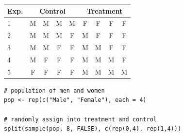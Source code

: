 \documentclass[14pt]{beamer}
\begin{document}
\begin{frame}[fragile]

\begin{center}
\begin{tabular}{lcccccccc}
Exp. & \multicolumn{4}{c}{Control} & \multicolumn{4}{c}{Treatment} \\ \midrule
1 & M & M & M & M & F & F & F & F \\
2 & M & M & M & F & M & F & F & F \\
3 & M & M & F & F & M & M & F & F \\
4 & M & F & F & F & M & M & M & F \\
5 & F & F & F & F & M & M & M & M \\ \bottomrule
\end{tabular}
\end{center}


{\scriptsize
\begin{verbatim}
# population of men and women
pop <- rep(c("Male", "Female"), each = 4)

# randomly assign into treatment and control
split(sample(pop, 8, FALSE), c(rep(0,4), rep(1,4)))
\end{verbatim}
}

\end{frame}

\end{document}
